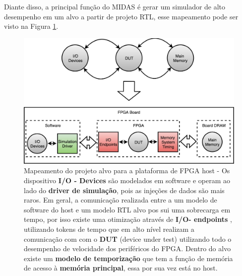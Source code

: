 \documentclass[conference]{IEEEtran}
\begin{document}
	
	Diante disso, a principal função do MIDAS é gerar um simulador de alto desempenho em um alvo a partir de projeto RTL, esse mapeamento pode ser visto na Figura \ref{Mapeamento}. 
	
	\begin{figure}[htbp]
		\centerline{\includegraphics[scale=0.14]{fig2.png}}
		\caption{Mapeamento do projeto alvo para a plataforma de FPGA host -
			Os dispositivo  \textbf{I/O - Devices} são modelados em software e operam ao lado do \textbf{driver de simulação}, pois  as injeções de dados são mais raros.
			Em geral, a comunicação realizada entre a um modelo de software do host e um modelo RTL alvo pos
			sui uma sobrecarga em tempo, por isso existe uma otimização através de  \textbf{I/O- endpoints} , utilizando tokens de tempo que em alto nível  realizam a comunicação com  com o \textbf{DUT} (device under test) utilizando todo o  desempenho de velocidade dos periféricos do FPGA. 
			Dentro do alvo existe um \textbf{modelo de temporização} que tem a função de memória de acesso à \textbf{memória principal}, essa por sua vez está no host.
		}
		
		\label{Mapeamento}
	\end{figure}
	
	
	
	
	
\end{document}
